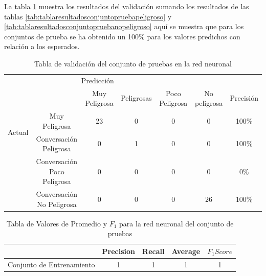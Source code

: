 La tabla \ref{tab:redpruebas} muestra los resultados del validaci\'on sumando los resultados de las tablas \ref{tab:tablaresultadosconjuntopruebapeligroso} y \ref{tab:tablaresultadosconjuntopruebanopeligroso} aquí se muestra que para los conjuntos de prueba se ha obtenido un 100\% para los valores predichos con relaci\'on a los esperados.
\begin{table}[h]
\begin{center}
\begin{tabular}{c|c|c|c|c|c|c|}
\multicolumn{5}{c}{Predicci\'on} \\
\cline{2-7}
& &  Muy Peligrosa & Peligrosas & Poco Peligrosa & No peligrosa &  Precisi\'on \\
\cline{2-7}
\multirow{2}{*}{Actual} & Muy Peligrosa & 23 & 0 & 0 & 0 & 100\% \\
\cline{2-7}
& Conversaci\'on Peligrosa & 0 & 1 &  0 & 0 & 100\% \\
\cline{2-7}
& Conversaci\'on Poco Peligrosa & 0 & 0 &  0 & 0 & 0\% \\
\cline{2-7}
& Conversaci\'on No Peligrosa & 0 & 0 &  0 & 26 & 100\% \\
\cline{2-7}


\end{tabular}
\caption{Tabla de validaci\'on del conjunto de pruebas en la red neuronal}
\label{tab:redpruebas}
\end{center}
\end{table}

\begin{table}[h]
\begin{center}
\begin{tabular}{c|cc|c|c|}
& Precision & Recall & Average & $F_1 Score$ \\
\hline
Conjunto de Entrenamiento & 1 & 1 & 1 &  1 \\ 

\end{tabular}

\label{tab:valores}
\caption{Tabla de Valores de Promedio y $F_1$ para la red neuronal del conjunto de pruebas}
\end{center}
\end{table}